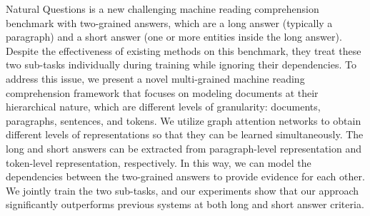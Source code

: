 Natural Questions is a new challenging machine reading comprehension benchmark with two-grained answers, which are a long answer (typically a paragraph) and a short answer (one or more entities inside the long answer).  Despite the effectiveness of existing methods on this benchmark, they treat these two sub-tasks individually during training while ignoring their dependencies. To address this issue, we present a novel multi-grained machine reading comprehension framework that focuses on modeling documents at their hierarchical nature, which are different levels of granularity: documents, paragraphs, sentences, and tokens. We utilize graph attention networks to obtain different levels of representations so that they can be learned simultaneously. The long and short answers can be extracted from paragraph-level representation and token-level representation, respectively. In this way, we can model the dependencies between the two-grained answers to provide evidence for each other. We jointly train the two sub-tasks, and our experiments show that our approach significantly outperforms previous systems at both long and short answer criteria.

